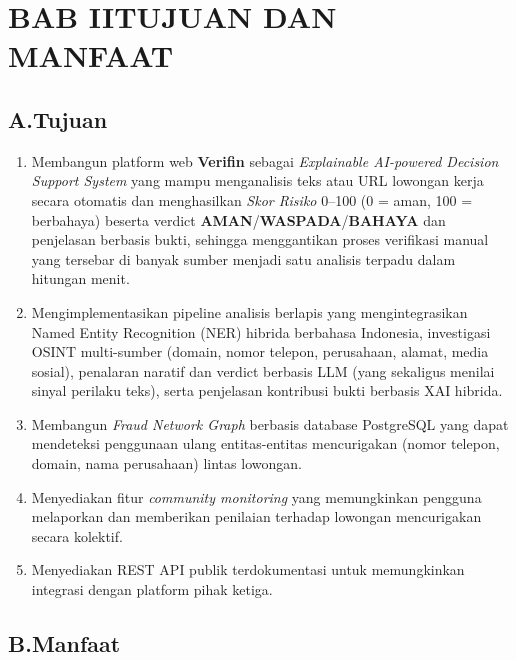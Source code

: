 \documentclass[12pt,a4paper]{article}
\begin{document}
\section*{BAB II\quad TUJUAN DAN MANFAAT}

\subsection*{A.\quad Tujuan}

\begin{enumerate}[label=\textbf{\arabic*.}]
\item Membangun platform web \textbf{Verifin} sebagai \textit{Explainable AI-powered Decision
      Support System} yang mampu menganalisis teks atau URL lowongan kerja secara otomatis dan
      menghasilkan \textit{Skor Risiko} 0--100 (0 = aman, 100 = berbahaya) beserta verdict
      \textbf{AMAN}\allowbreak/\textbf{WASPADA}\allowbreak/\textbf{BAHAYA} dan penjelasan berbasis
      bukti, sehingga menggantikan proses verifikasi manual yang tersebar di banyak sumber
      menjadi satu analisis terpadu dalam hitungan menit.

\item Mengimplementasikan pipeline analisis berlapis yang mengintegrasikan Named Entity Recognition
      (NER) hibrida berbahasa Indonesia, investigasi OSINT multi-sumber
      (domain, nomor telepon, perusahaan, alamat, media sosial), penalaran naratif dan verdict
      berbasis LLM (yang sekaligus menilai sinyal perilaku teks), serta penjelasan kontribusi
      bukti berbasis XAI hibrida.

\item Membangun \textit{Fraud Network Graph} berbasis database PostgreSQL yang dapat mendeteksi
      penggunaan ulang entitas-entitas mencurigakan (nomor telepon, domain, nama perusahaan) lintas
      lowongan.

\item Menyediakan fitur \textit{community monitoring} yang memungkinkan pengguna melaporkan dan
      memberikan penilaian terhadap lowongan mencurigakan secara kolektif.

\item Menyediakan REST API publik terdokumentasi untuk memungkinkan integrasi dengan platform
      pihak ketiga.
\end{enumerate}

\subsection*{B.\quad Manfaat}
\end{document}
